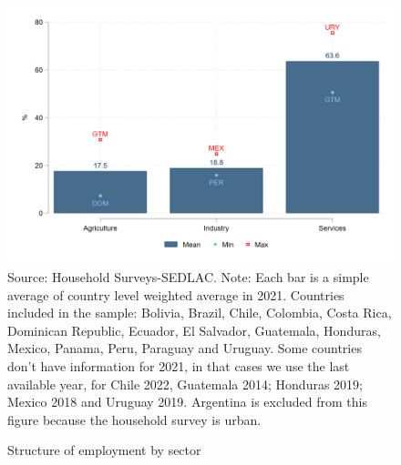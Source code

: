 \documentclass[english]{article}
\begin{document}
\begin{enumerate}
\begin{figure}[h!tbp]
        \justifying
        \caption{Structure of employment by sector}     
        \includegraphics[scale=.3]{latex/figures/Snapshot/Structure of employment and sector.png}
        \label{fig:sector}
       \footnotesize{Source: Household Surveys-SEDLAC.}
        \footnotesize{Note: Each bar is a simple average of country level weighted average in 2021. Countries included in the sample: Bolivia, Brazil, Chile, Colombia, Costa Rica, Dominican Republic, Ecuador, El Salvador, Guatemala, Honduras, Mexico, Panama, Peru, Paraguay and Uruguay. Some countries don’t have information for 2021, in that cases we use the last available year, for Chile 2022, Guatemala 2014; Honduras 2019; Mexico 2018 and Uruguay 2019. Argentina is excluded from this figure because the household survey is urban.}
\end{figure}


\end{enumerate}
\end{document}
